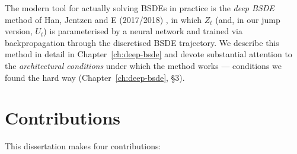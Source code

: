 The modern tool for actually solving BSDEs in practice is the \emph{deep BSDE} method of Han, Jentzen and E (2017/2018) \cite{han2018}, in which $Z_t$ (and, in our jump version, $U_t$) is parameterised by a neural network and trained via backpropagation through the discretised BSDE trajectory. We describe this method in detail in Chapter~\ref{ch:deep-bsde} and devote substantial attention to the \emph{architectural conditions} under which the method works --- conditions we found the hard way (Chapter~\ref{ch:deep-bsde}, \S3).

\section{Contributions}

This dissertation makes four contributions:

